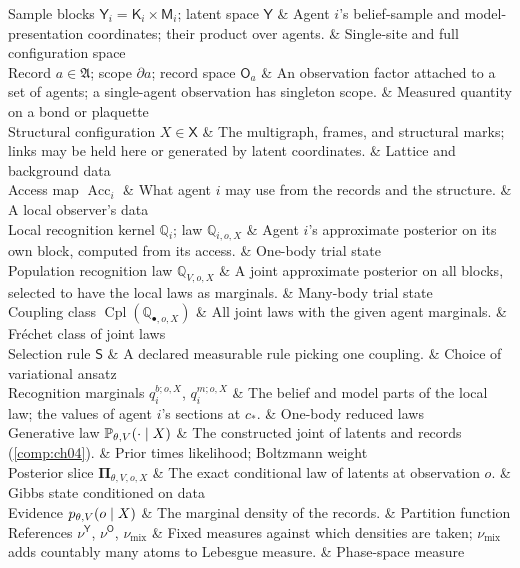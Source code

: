 \begin{decoder}
Sample blocks $\mathsf Y_i=\mathsf K_i\times\mathsf M_i$; latent space $\mathsf Y$ & Agent $i$'s belief-sample and model-presentation coordinates; their product over agents. & Single-site and full configuration space \\
Record $a\in\mathfrak A$; scope $\partial a$; record space $\mathsf O_a$ & An observation factor attached to a set of agents; a single-agent observation has singleton scope. & Measured quantity on a bond or plaquette \\
Structural configuration $X\in\mathsf X$ & The multigraph, frames, and structural marks; links may be held here or generated by latent coordinates. & Lattice and background data \\
Access map $\operatorname{Acc}_i$ & What agent $i$ may use from the records and the structure. & A local observer's data \\
Local recognition kernel $\mathbb Q_i$; law $\mathbb Q_{i,o,X}$ & Agent $i$'s approximate posterior on its own block, computed from its access. & One-body trial state \\
Population recognition law $\mathbb Q_{V,o,X}$ & A joint approximate posterior on all blocks, selected to have the local laws as marginals. & Many-body trial state \\
Coupling class $\operatorname{Cpl}(\mathbb Q_{\bullet,o,X})$ & All joint laws with the given agent marginals. & Fr\'echet class of joint laws \\
Selection rule $\mathsf S$ & A declared measurable rule picking one coupling. & Choice of variational ansatz \\
Recognition marginals $q_i^{b;o,X}$, $q_i^{m;o,X}$ & The belief and model parts of the local law; the values of agent $i$'s sections at $c_*$. & One-body reduced laws \\
Generative law $\mathbb P_{\theta,V}(\cdot\mid X)$ & The constructed joint of latents and records (\cref{comp:ch04}). & Prior times likelihood; Boltzmann weight \\
Posterior slice $\boldsymbol\Pi_{\theta,V,o,X}$ & The exact conditional law of latents at observation $o$. & Gibbs state conditioned on data \\
Evidence $p_{\theta,V}(o\mid X)$ & The marginal density of the records. & Partition function \\
References $\nu^{\mathsf Y}$, $\nu^{\mathsf O}$, $\nu_{\mathrm{mix}}$ & Fixed measures against which densities are taken; $\nu_{\mathrm{mix}}$ adds countably many atoms to Lebesgue measure. & Phase-space measure \\

\end{decoder}
